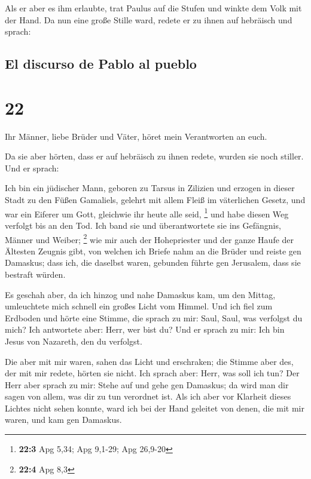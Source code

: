  Als er aber es ihm erlaubte, trat Paulus auf die Stufen
und winkte dem Volk mit der Hand. Da nun eine große Stille ward, redete
er zu ihnen auf hebräisch und sprach:

\hypertarget{el-discurso-de-pablo-al-pueblo}{%
\subsection{El discurso de Pablo al
pueblo}\label{el-discurso-de-pablo-al-pueblo}}

\hypertarget{section-21}{%
\section{22}\label{section-21}}

 Ihr Männer, liebe Brüder und Väter, höret mein
Verantworten an euch.

 Da sie aber hörten, dass er auf hebräisch zu ihnen
redete, wurden sie noch stiller. Und er sprach:

 Ich bin ein jüdischer Mann, geboren zu Tarsus in Zilizien
und erzogen in dieser Stadt zu den Füßen Gamaliels, gelehrt mit allem
Fleiß im väterlichen Gesetz, und war ein Eiferer um Gott, gleichwie ihr
heute alle seid, \footnote{\textbf{22:3} Apg 5,34; Apg 9,1-29; Apg
  26,9-20}  und habe diesen Weg verfolgt bis an den Tod.
Ich band sie und überantwortete sie ins Gefängnis, Männer und Weiber;
\footnote{\textbf{22:4} Apg 8,3}  wie mir auch der
Hohepriester und der ganze Haufe der Ältesten Zeugnis gibt, von welchen
ich Briefe nahm an die Brüder und reiste gen Damaskus; dass ich, die
daselbst waren, gebunden führte gen Jerusalem, dass sie bestraft würden.

 Es geschah aber, da ich hinzog und nahe Damaskus kam, um
den Mittag, umleuchtete mich schnell ein großes Licht vom Himmel.
 Und ich fiel zum Erdboden und hörte eine Stimme, die
sprach zu mir: Saul, Saul, was verfolgst du mich?  Ich
antwortete aber: Herr, wer bist du? Und er sprach zu mir: Ich bin Jesus
von Nazareth, den du verfolgst.

 Die aber mit mir waren, sahen das Licht und erschraken;
die Stimme aber des, der mit mir redete, hörten sie nicht.
 Ich sprach aber: Herr, was soll ich tun? Der Herr aber
sprach zu mir: Stehe auf und gehe gen Damaskus; da wird man dir sagen
von allem, was dir zu tun verordnet ist.  Als ich aber
vor Klarheit dieses Lichtes nicht sehen konnte, ward ich bei der Hand
geleitet von denen, die mit mir waren, und kam gen Damaskus.

